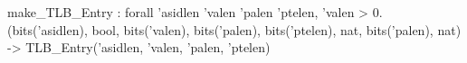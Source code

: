 make_TLB_Entry : forall 'asidlen 'valen 'palen 'ptelen, 'valen > 0.
  (bits('asidlen), bool, bits('valen), bits('palen), bits('ptelen), nat, bits('palen), nat) -> TLB_Entry('asidlen, 'valen, 'palen, 'ptelen)